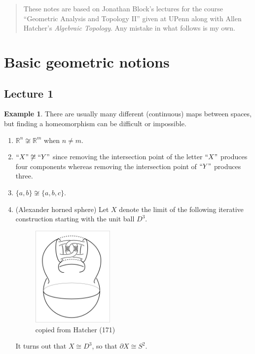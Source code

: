 \documentclass[10pt,letterpaper,cm]{nupset}
\theoremstyle{definition}
\newtheorem{exmp}[definition]{Example}
\theoremstyle{theorem}
\theoremstyle{remark}
\newcommand{\R}{\mathbb{R}}
\newcommand{\1}{\mathbb{1}}
\newcommand{\0}{\vec 0}
\begin{document}
\begin{abstract}
These notes are based on Jonathan Block's lectures for the course ``Geometric Analysis and Topology II'' given at UPenn along with Allen Hatcher's \textit{Algebraic Topology}. Any mistake in what follows is my own.
\end{abstract}

\tableofcontents
\newpage

\section{Basic geometric notions} 

\subsection{Lecture 1}

\begin{exmp} There are usually many different (continuous) maps between spaces, but finding a homeomorphism can be difficult or impossible.
\begin{enumerate}
\item $\R^n \not \cong \R^m$ when $n \ne m$.
\item $``X" \not \cong ``Y"$ since removing the intersection point of the letter $``X" $ produces four components whereas removing the intersection point of $``Y"$ produces three.
\item $\{a, b\} \not \cong \{a,b, c\}$.
\item {(Alexander horned sphere)} Let $X$ denote the limit of the following iterative construction starting with the unit ball $D^3$. 
\begin{figure}[H]
\centering
\includegraphics[width=40mm]{Hatcher-HornedSphere.png}
\caption{copied from Hatcher (171) \label{overflow}}
\end{figure}
It turns out that $X \cong D^3$, so that $\partial{X} \cong S^2$.
\end{enumerate}
\end{exmp}
\end{document}
